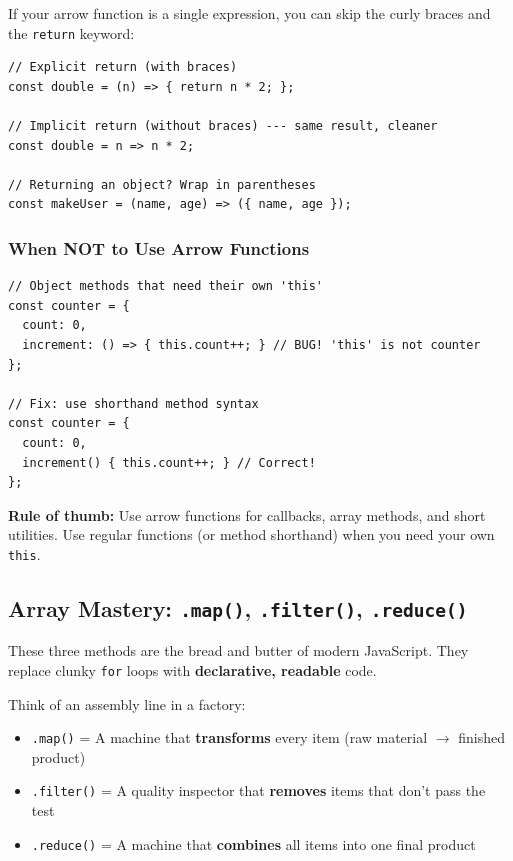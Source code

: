 \documentclass[12pt]{article}
\begin{document}
If your arrow function is a single expression, you can skip the curly braces and the \texttt{return} keyword:

\begin{lstlisting}
// Explicit return (with braces)
const double = (n) => { return n * 2; };

// Implicit return (without braces) --- same result, cleaner
const double = n => n * 2;

// Returning an object? Wrap in parentheses
const makeUser = (name, age) => ({ name, age });
\end{lstlisting}

\subsubsection*{When NOT to Use Arrow Functions}

\begin{lstlisting}
// Object methods that need their own 'this'
const counter = {
  count: 0,
  increment: () => { this.count++; } // BUG! 'this' is not counter
};

// Fix: use shorthand method syntax
const counter = {
  count: 0,
  increment() { this.count++; } // Correct!
};
\end{lstlisting}

\textbf{Rule of thumb:} Use arrow functions for callbacks, array methods, and short utilities. Use regular functions (or method shorthand) when you need your own \texttt{this}.

\subsection{Array Mastery: \texttt{.map()}, \texttt{.filter()}, \texttt{.reduce()}}

These three methods are the bread and butter of modern JavaScript. They replace clunky \texttt{for} loops with \textbf{declarative, readable} code.

\begin{analogybox}
Think of an assembly line in a factory:
\begin{itemize}[noitemsep]
    \item \texttt{.map()} = A machine that \textbf{transforms} every item (raw material $\rightarrow$ finished product)
    \item \texttt{.filter()} = A quality inspector that \textbf{removes} items that don't pass the test
    \item \texttt{.reduce()} = A machine that \textbf{combines} all items into one final product
\end{itemize}
\end{analogybox}
\end{document}
